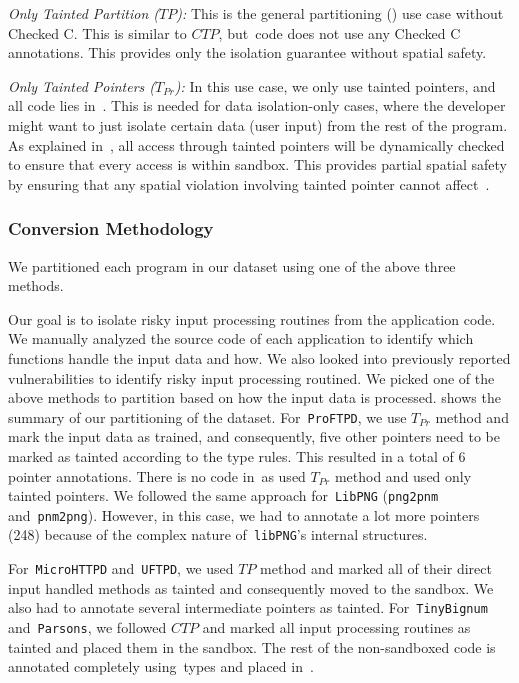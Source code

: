 \noindent\emph{Only Tainted Partition ($TP$):}
This is the general partitioning () use case without Checked C.
This is similar to $CTP$, but~\cregion code does not use any Checked C annotations.
This provides only the isolation guarantee without spatial safety.


\noindent\emph{Only Tainted Pointers ($T_{Pr}$):}
In this use case, we only use tainted pointers, and all code lies in~\cregion.
This is needed for data isolation-only cases, where the developer might want to just isolate certain data (\eg user input) from the rest of the program.
As explained in~, all access through tainted pointers will be dynamically checked to ensure that every access is within sandbox.
This provides partial spatial safety by ensuring that any spatial violation involving tainted pointer cannot affect~\cregion.


\subsubsection{Conversion Methodology}
We partitioned each program in our dataset using one of the above three methods.

Our goal is to isolate risky input processing routines from the application code.
We manually analyzed the source code of each application to identify which functions handle the input data and how.
We also looked into previously reported vulnerabilities to identify risky input processing routined.
We picked one of the above methods to partition based on how the input data is processed.
\tbl{} shows the summary of our partitioning of the dataset.
For~\texttt{ProFTPD}, we use $T_{Pr}$ method and mark the input data as trained, and consequently, five other pointers need to be marked as tainted according to the type rules. This resulted in a total of 6 pointer annotations. There is no code in~\ucregion as used $T_{Pr}$ method and used only tainted pointers.
We followed the same approach for~\texttt{LibPNG} (\texttt{png2pnm} and~\texttt{pnm2png}). However, in this case, we had to annotate a lot more pointers (248) because of the complex nature of~\texttt{libPNG}'s internal structures.

For~\texttt{MicroHTTPD} and~\texttt{UFTPD}, we used $TP$ method and marked all of their direct input handled methods as tainted and consequently moved to the sandbox.
We also had to annotate several intermediate pointers as tainted.
For~\texttt{TinyBignum} and~\texttt{Parsons}, we followed $CTP$ and marked all input processing routines as tainted and placed them in the sandbox.
The rest of the non-sandboxed code is annotated completely using~\checkedc types and placed in~\cregion.


